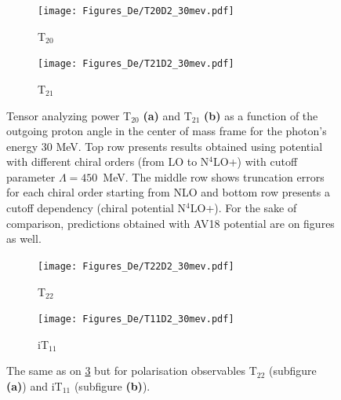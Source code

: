     \begin{figure}[htb]
        \centering
        \begin{subfigure}[b]{0.46\textwidth}
            \texttt{[image: Figures\_De/T20D2\_30mev.pdf]}
            \caption{T$_{20}$}
            \label{T20_30_vert}
        \end{subfigure}
        \begin{subfigure}[b]{0.46\textwidth}
            \texttt{[image: Figures\_De/T21D2\_30mev.pdf]}
            \caption{T$_{21}$}
            \label{T21_30_vert}
        \end{subfigure}
        \caption{Tensor analyzing power T$_{20}$  {\bf (a)}
        and T$_{21}$ {\bf (b)}
        as a function of the outgoing proton angle in the center of mass frame 
        for the photon's energy 30 MeV.
        Top row presents results obtained using potential
        with different chiral orders (from LO to N$^4$LO+) with cutoff parameter $\Lambda=450$~MeV.
        The middle row shows truncation errors for each 
        chiral order starting from NLO and
        bottom row presents a cutoff dependency (chiral potential N$^4$LO+).
        For the sake of comparison, predictions obtained with AV18 potential are on figures as well.}
        \label{T20_T21_30}
    \end{figure}

    \begin{figure}[htb]
        \centering
        \begin{subfigure}[b]{0.46\textwidth}
            \texttt{[image: Figures\_De/T22D2\_30mev.pdf]}
            \caption{T$_{22}$}
            \label{T22_30_vert}
        \end{subfigure}
        \begin{subfigure}[b]{0.46\textwidth}
            \texttt{[image: Figures\_De/T11D2\_30mev.pdf]}
            \caption{iT$_{11}$}
            \label{T11_30_vert}
        \end{subfigure}
        \caption{The same as on \ref{T20_T21_30} but for polarisation observables
        T$_{22}$ (subfigure {\bf (a)}) and iT$_{11}$ (subfigure {\bf (b)}).}
        \label{T22_T11_30}
    \end{figure}


